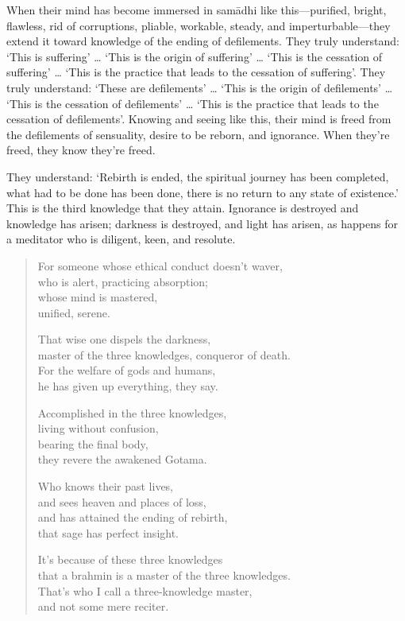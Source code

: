 \documentclass[12pt,openany]{book}%
\begin{document}
When their mind has become immersed in \textsanskrit{samādhi} like this—purified, bright, flawless, rid of corruptions, pliable, workable, steady, and imperturbable—they extend it toward knowledge of the ending of defilements. They truly understand: ‘This is suffering’ … ‘This is the origin of suffering’ … ‘This is the cessation of suffering’ … ‘This is the practice that leads to the cessation of suffering’. They truly understand: ‘These are defilements’ … ‘This is the origin of defilements’ … ‘This is the cessation of defilements’ … ‘This is the practice that leads to the cessation of defilements’. Knowing and seeing like this, their mind is freed from the defilements of sensuality, desire to be reborn, and ignorance. When they’re freed, they know they’re freed. 

They understand: ‘Rebirth is ended, the spiritual journey has been completed, what had to be done has been done, there is no return to any state of existence.’ This is the third knowledge that they attain. Ignorance is destroyed and knowledge has arisen; darkness is destroyed, and light has arisen, as happens for a meditator who is diligent, keen, and resolute. 

\begin{verse}%
For someone whose ethical conduct doesn’t waver, \\
who is alert, practicing absorption; \\
whose mind is mastered, \\
unified, serene. 

That wise one dispels the darkness, \\
master of the three knowledges, conqueror of death. \\
For the welfare of gods and humans, \\
he has given up everything, they say. 

Accomplished in the three knowledges, \\
living without confusion, \\
bearing the final body, \\
they revere the awakened Gotama. 

Who knows their past lives, \\
and sees heaven and places of loss, \\
and has attained the ending of rebirth, \\
that sage has perfect insight. 

It’s because of these three knowledges \\
that a brahmin is a master of the three knowledges. \\
That’s who I call a three-knowledge master, \\
and not some mere reciter. 

%
\end{verse}
\end{document}
